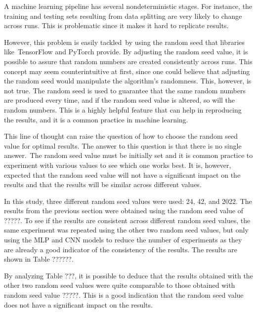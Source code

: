 A machine learning pipeline has several nondeterministic stages. For instance, the training and testing sets resulting from data splitting are very likely to change across runs. This is problematic since it makes it hard to replicate results.

However, this problem is easily tackled by using the random seed that libraries like TensorFlow and PyTorch provide. By adjusting the random seed value, it is possible to assure that random numbers are created consistently across runs. This concept may seem counterintuitive at first, since one could believe that adjusting the random seed would manipulate the algorithm's randomness. This, however, is not true. The random seed is used to guarantee that the same random numbers are produced every time, and if the random seed value is altered, so will the random numbers. This is a highly helpful feature that can help in reproducing the results, and it is a common practice in machine learning.

This line of thought can raise the question of how to choose the random seed value for optimal results. The answer to this question is that there is no single answer. The random seed value must be initially set and it is common practice to experiment with various values to see which one works best. It is, however, expected that the random seed value will not have a significant impact on the results and that the results will be similar across different values.

In this study, three different random seed values were used: 24, 42, and 2022. The results from the previous section were obtained using the random seed value of ?????. To see if the results are consistent across different random seed values, the same experiment was repeated using the other two random seed values, but only using the MLP and CNN models to reduce the number of experiments as they are already a good indicator of the consistency of the results. The results are shown in Table ??????.


By analyzing Table ???, it is possible to deduce that the results obtained with the other two random seed values were quite comparable to those obtained with random seed value ?????. This is a good indication that the random seed value does not have a significant impact on the results.
